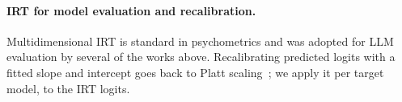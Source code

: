 \paragraph{IRT for model evaluation and recalibration.}
Multidimensional IRT is standard in psychometrics and was adopted for LLM evaluation by several of the works above. Recalibrating predicted logits with a fitted slope and intercept goes back to Platt scaling~\citep{platt1999probabilistic}; we apply it per target model, to the IRT logits.

